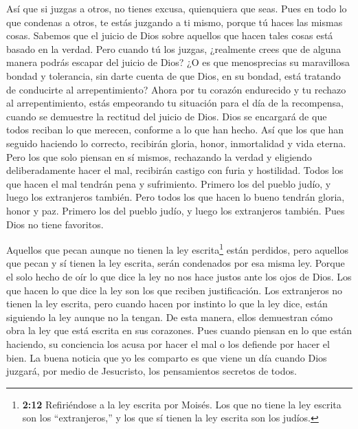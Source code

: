  Así que si juzgas a otros, no tienes excusa, quienquiera
que seas. Pues en todo lo que condenas a otros, te estás juzgando a ti
mismo, porque tú haces las mismas cosas.  Sabemos que el
juicio de Dios sobre aquellos que hacen tales cosas está basado en la
verdad.  Pero cuando tú los juzgas, ¿realmente crees que de
alguna manera podrás escapar del juicio de Dios?  ¿O es que
menosprecias su maravillosa bondad y tolerancia, sin darte cuenta de que
Dios, en su bondad, está tratando de conducirte al arrepentimiento?
 Ahora por tu corazón endurecido y tu rechazo al
arrepentimiento, estás empeorando tu situación para el día de la
recompensa, cuando se demuestre la rectitud del juicio de Dios.
 Dios se encargará de que todos reciban lo que merecen,
conforme a lo que han hecho.  Así que los que han seguido
haciendo lo correcto, recibirán gloria, honor, inmortalidad y vida
eterna.  Pero los que solo piensan en sí mismos, rechazando
la verdad y eligiendo deliberadamente hacer el mal, recibirán castigo
con furia y hostilidad.  Todos los que hacen el mal tendrán
pena y sufrimiento. Primero los del pueblo judío, y luego los
extranjeros también.  Pero todos los que hacen lo bueno
tendrán gloria, honor y paz. Primero los del pueblo judío, y luego los
extranjeros también.  Pues Dios no tiene favoritos.

 Aquellos que pecan aunque no tienen la ley
escrita\footnote{\textbf{2:12} Refiriéndose a la ley escrita por Moisés.
  Los que no tiene la ley escrita son los ``extranjeros,'' y los que sí
  tienen la ley escrita son los judíos.} están perdidos, pero aquellos
que pecan y sí tienen la ley escrita, serán condenados por esa misma
ley.  Porque el solo hecho de oír lo que dice la ley no nos
hace justos ante los ojos de Dios. Los que hacen lo que dice la ley son
los que reciben justificación.  Los extranjeros no tienen
la ley escrita, pero cuando hacen por instinto lo que la ley dice, están
siguiendo la ley aunque no la tengan.  De esta manera,
ellos demuestran cómo obra la ley que está escrita en sus corazones.
Pues cuando piensan en lo que están haciendo, su conciencia los acusa
por hacer el mal o los defiende por hacer el bien.  La
buena noticia que yo les comparto es que viene un día cuando Dios
juzgará, por medio de Jesucristo, los pensamientos secretos de todos.

